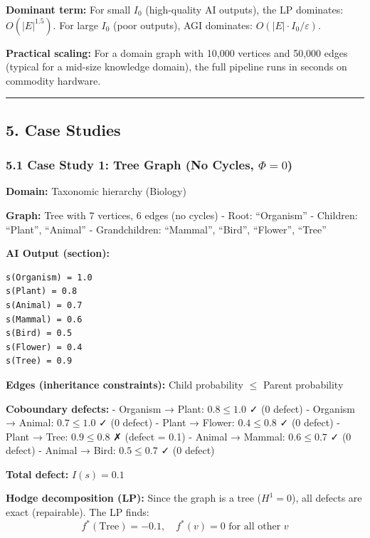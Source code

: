 \documentclass[
]{article}
\begin{document}
\textbf{Dominant term:} For small \(I_0\) (high-quality AI outputs), the
LP dominates: \(O(|E|^{1.5})\). For large \(I_0\) (poor outputs), AGI
dominates: \(O(|E| \cdot I_0 / \varepsilon)\).

\textbf{Practical scaling:} For a domain graph with 10,000 vertices and
50,000 edges (typical for a mid-size knowledge domain), the full
pipeline runs in seconds on commodity hardware.

\begin{center}\rule{0.5\linewidth}{0.5pt}\end{center}

\subsection{5. Case Studies}\label{case-studies}

\subsubsection{\texorpdfstring{5.1 Case Study 1: Tree Graph (No Cycles,
\(\Phi = 0\))}{5.1 Case Study 1: Tree Graph (No Cycles, \textbackslash Phi = 0)}}\label{case-study-1-tree-graph-no-cycles-phi-0}

\textbf{Domain:} Taxonomic hierarchy (Biology)

\textbf{Graph:} Tree with 7 vertices, 6 edges (no cycles) - Root:
``Organism'' - Children: ``Plant'', ``Animal'' - Grandchildren:
``Mammal'', ``Bird'', ``Flower'', ``Tree''

\textbf{AI Output (section):}

\begin{verbatim}
s(Organism) = 1.0
s(Plant) = 0.8
s(Animal) = 0.7
s(Mammal) = 0.6
s(Bird) = 0.5
s(Flower) = 0.4
s(Tree) = 0.9
\end{verbatim}

\textbf{Edges (inheritance constraints):} Child probability \(\leq\)
Parent probability

\textbf{Coboundary defects:} - Organism → Plant: \(0.8 \leq 1.0\) ✓ (0
defect) - Organism → Animal: \(0.7 \leq 1.0\) ✓ (0 defect) - Plant →
Flower: \(0.4 \leq 0.8\) ✓ (0 defect) - Plant → Tree: \(0.9 \leq 0.8\) ✗
(defect = 0.1) - Animal → Mammal: \(0.6 \leq 0.7\) ✓ (0 defect) - Animal
→ Bird: \(0.5 \leq 0.7\) ✓ (0 defect)

\textbf{Total defect:} \(I(s) = 0.1\)

\textbf{Hodge decomposition (LP):} Since the graph is a tree
(\(H^1 = 0\)), all defects are exact (repairable). The LP finds:
\[f^*(\text{Tree}) = -0.1, \quad f^*(v) = 0 \text{ for all other } v\]
\end{document}
